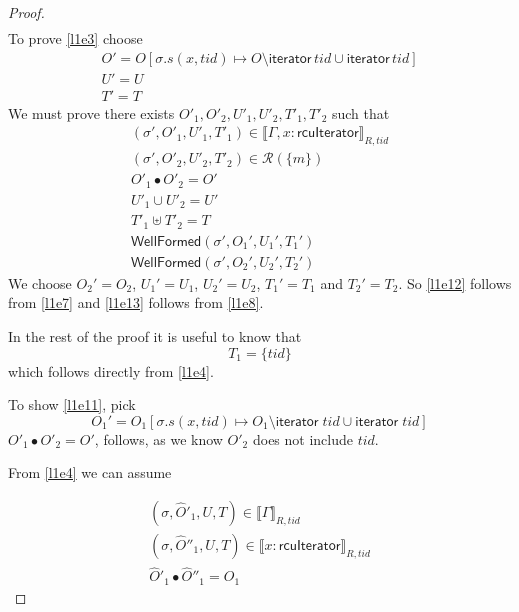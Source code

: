 \begin{proof}
\begin{gather}
\end{gather}
%
To prove \ref{l1e3} choose 
%
\[
\begin{array}{cl}
O' = O[ \sigma.s(x,tid) \mapsto O \setminus \textsf{iterator} \, tid  \cup \textsf{iterator} \, tid ] \\
U' = U \\
T' = T
\end{array}
\]
We must prove there exists $O'_{1}, O'_{2}, U'_{1}, U'_{2}, T'_{1}, T'_{2}$ such that
\begin{gather}\label{l1e9}
(\sigma',O'_{1},U'_{1}, T'_{1}) \in \llbracket \Gamma,x:\textsf{rcuIterator} \rrbracket_{R,tid}
\\
\label{l1e10}
(\sigma',O'_{2},U'_{2}, T'_{2}) \in \mathcal{R}(\{m\})
\\
 \label{l1e11}
O'_{1} \bullet O'_{2} = O'
\\
\label{l1e12}
U'_{1} \cup U'_{2} = U' 
\\
\label{l1e13}
T'_{1} \uplus T'_{2} = T
\\
\label{l1wfp1}
\textsf{WellFormed}(\sigma',O_{1}',U_{1}',T_{1}')
\\
\label{l1wfp2}
\textsf{WellFormed}(\sigma',O_{2}',U_{2}',T_{2}')
\end{gather}
%
We choose $O_{2}' = O_{2}$, $U_{1}' = U_{1}$, $U_{2}' = U_{2}$, $T_{1}' = T_{1}$ and $T_{2}' = T_{2}$.
So \ref{l1e12} follows from \ref{l1e7} and \ref{l1e13} follows from \ref{l1e8}.

In the rest of the proof it is useful to know that 
\begin{equation} \label{l1e14}
T_{1} = \{tid\}
\end{equation}
which follows directly from \ref{l1e4}.

To show \ref{l1e11}, pick
\[
O_{1}'  = O_{1}[\sigma.s(x,tid) \mapsto O_{1} \setminus \textsf{iterator} \;  tid \cup \textsf{iterator} \; tid]
\]
$O'_{1} \bullet O'_{2} = O'$, follows, as we know $O'_{2}$ does not include $tid$.

From \ref{l1e4} we can assume 

\begin{gather} \label{l1e18}
(\sigma,\hat{O}'_{1}, U, T) \in \llbracket \Gamma \rrbracket_{R,tid}
\\
 \label{l1e19}
(\sigma,\hat{O}''_{1}, U, T) \in \llbracket x:\textsf{rcuIterator} \rrbracket_{R,tid}
\\
 \label{l1e20}
\hat{O}'_{1} \bullet \hat{O}''_{1} = O_{1}
\end{gather}


\end{proof}
